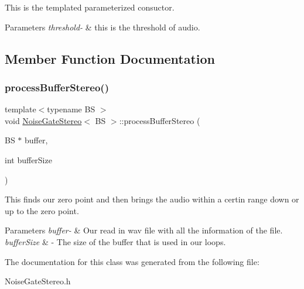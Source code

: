 This is the templated parameterized consuctor. 
\begin{DoxyParams}{Parameters}
{\em threshold-\/} & this is the threshold of audio. \\
\hline
\end{DoxyParams}


\subsection{Member Function Documentation}
\mbox{\label{classNoiseGateStereo_a4b084863de9b3c138f4c1f8b30e70c6e}} 
\subsubsection{\texorpdfstring{process\+Buffer\+Stereo()}{processBufferStereo()}}
{\footnotesize\ttfamily template$<$typename BS $>$ \\
void \hyperlink{classNoiseGateStereo}{Noise\+Gate\+Stereo}$<$ BS $>$\+::process\+Buffer\+Stereo (\begin{DoxyParamCaption}\item[{BS $\ast$}]{buffer,  }\item[{int}]{buffer\+Size }\end{DoxyParamCaption})}

This finds our zero point and then brings the audio within a certin range down or up to the zero point. 
\begin{DoxyParams}{Parameters}
{\em buffer-\/} & Our read in wav file with all the information of the file. \\
\hline
{\em buffer\+Size} & -\/ The size of the buffer that is used in our loops. \\
\hline
\end{DoxyParams}


The documentation for this class was generated from the following file\+:\begin{DoxyCompactItemize}
\item 
Noise\+Gate\+Stereo.\+h\end{DoxyCompactItemize}
